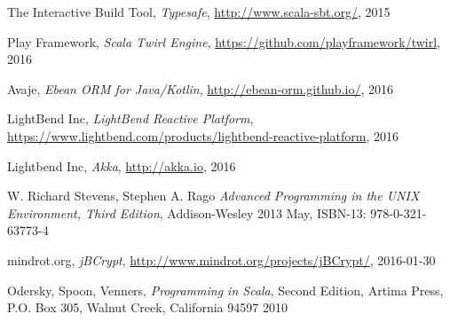 \documentclass[12pt,twoside,a4paper]{report}
\begin{document}
\begin{thebibliography}{99}
The Interactive Build Tool,
\emph{Typesafe},
\url{http://www.scala-sbt.org/},
2015

Play Framework,
\emph{Scala Twirl Engine},
\url{https://github.com/playframework/twirl},
2016

Avaje,
\emph{Ebean ORM for Java/Kotlin},
\url{http://ebean-orm.github.io/},
2016

LightBend Inc,
\emph{LightBend Reactive Platform},
\url{https://www.lightbend.com/products/lightbend-reactive-platform},
2016

Lightbend Inc,
\emph{Akka},
\url{http://akka.io},
2016

W. Richard Stevens, Stephen A. Rago
\emph{Advanced Programming in the UNIX Environment, Third Edition},
Addison-Wesley
2013 May, ISBN-13: 978-0-321-63773-4

mindrot.org,
\emph{jBCrypt},
\url{http://www.mindrot.org/projects/jBCrypt/},
2016-01-30

Odersky, Spoon, Venners,
\emph{Programming in Scala},
Second Edition,
Artima Press, P.O. Box 305, Walnut Creek, California 94597
2010

\end{thebibliography}
\end{document}
